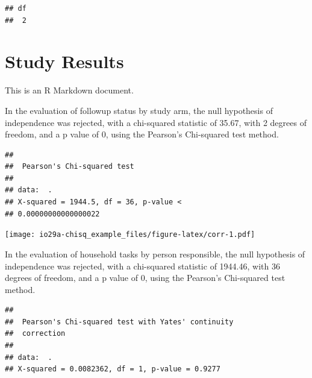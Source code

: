 \documentclass[
]{book}
\newenvironment{Shaded}{\begin{snugshade}}{\end{snugshade}}
\newcommand{\KeywordTok}[1]{\textcolor[rgb]{0.13,0.29,0.53}{\textbf{#1}}}
\newcommand{\NormalTok}[1]{#1}
\newcommand{\OperatorTok}[1]{\textcolor[rgb]{0.81,0.36,0.00}{\textbf{#1}}}
\newcommand{\StringTok}[1]{\textcolor[rgb]{0.31,0.60,0.02}{#1}}
\begin{document}
\begin{verbatim}
## df 
##  2
\end{verbatim}

\hypertarget{study-results-1}{%
\section{Study Results}\label{study-results-1}}

This is an R Markdown document.

In the evaluation of followup status by study arm, the null hypothesis of independence was rejected, with a chi-squared statistic of 35.67, with 2 degrees of freedom, and a p value of 0, using the Pearson's Chi-squared test method.

\begin{verbatim}
## 
##  Pearson's Chi-squared test
## 
## data:  .
## X-squared = 1944.5, df = 36, p-value <
## 0.00000000000000022
\end{verbatim}

\texttt{[image: io29a-chisq\_example\_files/figure-latex/corr-1.pdf]}

In the evaluation of household tasks by person responsible, the null hypothesis of independence was rejected, with a chi-squared statistic of 1944.46, with 36 degrees of freedom, and a p value of 0, using the Pearson's Chi-squared test method.

\begin{Shaded}
\end{Shaded}

\begin{verbatim}
## 
##  Pearson's Chi-squared test with Yates' continuity
##  correction
## 
## data:  .
## X-squared = 0.0082362, df = 1, p-value = 0.9277
\end{verbatim}
\end{document}
